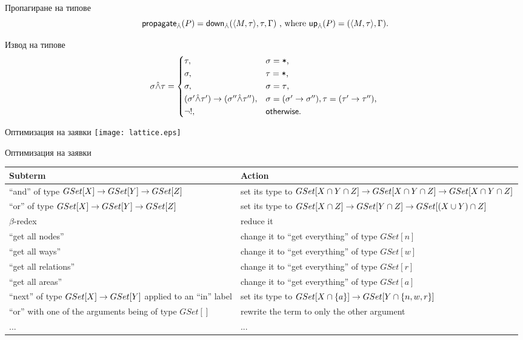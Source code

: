 \documentclass[9pt]{beamer}
\begin{document}
  \begin{frame}{Пропагиране на типове}
    \[
        \mathsf{propagate}_{\hat{\wedge}}(P) = \mathsf{down}_{\hat{\wedge}}(\langle M, \tau \rangle, \tau, \Gamma)
        \text{ , where } \mathsf{up}_{\hat{\wedge}}(P) = (\langle M, \tau \rangle, \Gamma).
    \]
  \end{frame}

  \begin{frame}{Извод на типове}
    \[
        \sigma \unify \tau =
        \begin{cases*}
            \tau ,& $\sigma = \text{\code{*}}$, \\
            \sigma ,& $\tau = \text{\code{*}}$, \\
            \sigma ,& $\sigma = \tau$, \\
            (\sigma' \unify \tau') \tot (\sigma'' \unify \tau''), &
                $\sigma = (\sigma' \tot \sigma''), \tau = (\tau' \tot \tau'')$, \\
            \lnot ! ,& $\mathsf{otherwise}$. \\
        \end{cases*}
    \]
  \end{frame}

  \begin{frame}{Оптимизация на заявки}
    \texttt{[image: lattice.eps]}
  \end{frame}

  \begin{frame}{Оптимизация на заявки}
\begin{center}
\begin{tabular}{|p{}|p{}|}
    \hline
    Subterm & Action \\
    \hline
    ``and'' of type $GSet[X] \rightarrow GSet[Y] \rightarrow GSet[Z]$
        & set its type to $GSet[X \cap Y \cap Z] \rightarrow GSet[X \cap Y \cap Z] \rightarrow GSet[X \cap Y \cap Z]$ \\
    \hline
    ``or'' of type $GSet[X] \rightarrow GSet[Y] \rightarrow GSet[Z]$
        & set its type to $GSet[X \cap Z] \rightarrow GSet[Y \cap Z] \rightarrow GSet[(X \cup Y) \cap Z]$ \\
    \hline
    $\beta$-redex & reduce it \\
    \hline
    ``get all nodes'' & change it to ``get everything'' of type $GSet[n]$ \\
    ``get all ways'' & change it to ``get everything'' of type $GSet[w]$ \\
    ``get all relations'' & change it to ``get everything'' of type $GSet[r]$ \\
    ``get all areas'' & change it to ``get everything'' of type $GSet[a]$ \\
    \hline
    ``next'' of type $GSet[X] \rightarrow GSet[Y]$ applied to an ``in'' label
        & set its type to $GSet[X \cap \{ a \}] \rightarrow GSet[Y \cap \{ n, w, r \}]$ \\
    \hline
    ``or'' with one of the arguments being of type $GSet[]$
        & rewrite the term to only the other argument \\
    \hline
    ... & ... \\
    \hline
\end{tabular}
\end{center}
  \end{frame}
\end{document}
